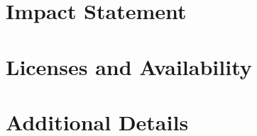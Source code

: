 \documentclass{article}
\newif\ifcameraready
\newcommand{\camerareadyonly}[1]{\ifcameraready #1\fi}
\begin{document}
\section*{Impact Statement}


\section*{Licenses and Availability}


\camerareadyonly{%
\section*{Author Contributions}

\section*{Acknowledgements}

}




\appendix
\onecolumn
\section{Additional Details}\label{sec:appendix}

\end{document}
